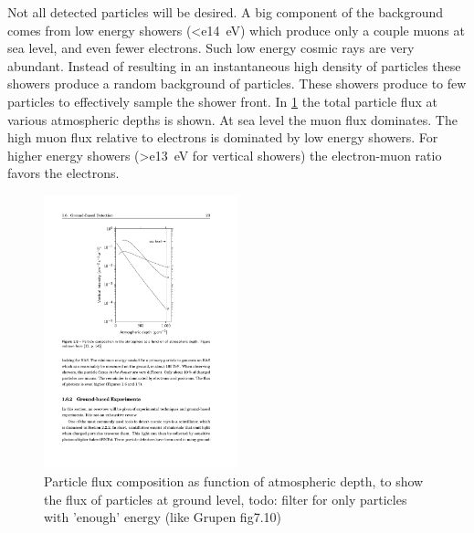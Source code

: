 Not all detected particles will be desired. A big component of the background comes from low energy showers (\SI{<e14}{\eV}) which produce only a couple muons at sea level, and even fewer electrons. Such low energy cosmic rays are very abundant. Instead of resulting in an instantaneous high density of particles these showers produce a random background of particles. These showers produce to few particles to effectively sample the shower front. In \cref{fig:particle_density} the total particle flux at various atmospheric depths is shown. At sea level the muon flux dominates. The high muon flux relative to electrons is dominated by low energy showers. For higher energy showers (\SI{>e13}{\eV} for vertical showers) the electron-muon ratio favors the electrons.

\begin{figure}
    \centering
    \includegraphics[width=0.5\textwidth]
                    {plots/cosmic-rays/particle_density}
    \caption{Particle flux composition as function of atmospheric depth, to show the flux of particles at ground level, todo: filter for only particles with 'enough' energy (like Grupen fig7.10)}
    \label{fig:particle_density}
\end{figure}


